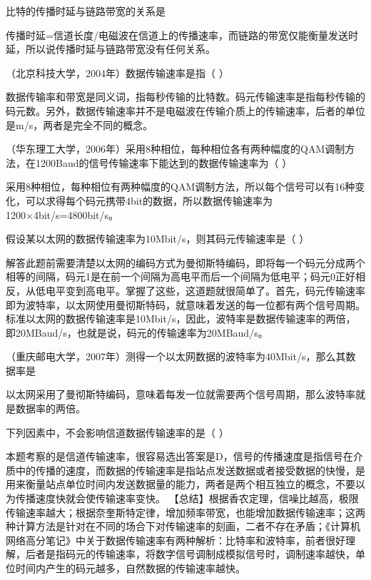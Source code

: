 \question 比特的传播时延与链路带宽的关系是
\par{}
\begin{solution}传播时延=信道长度/电磁波在信道上的传播速率，而链路的带宽仅能衡量发送时延，所以说传播时延与链路带宽没有任何关系。
\end{solution}
\question （北京科技大学，2004年）数据传输速率是指（ ）
\par{}
\begin{solution}数据传输率和带宽是同义词，指每秒传输的比特数。码元传输速率是指每秒传输的码元数。另外，数据传输速率并不是电磁波在传输介质上的传输速率，后者的单位是m/s，两者是完全不同的概念。
\end{solution}
\question （华东理工大学，2006年）采用8种相位，每种相位各有两种幅度的QAM调制方法，在1200Baud的信号传输速率下能达到的数据传输速率为（
）
\par{}
\begin{solution}采用8种相位，每种相位有两种幅度的QAM调制方法，所以每个信号可以有16种变化，可以求得每个码元携带4bit的数据，所以数据传输速率为1200×4bit/s=4800bit/s。
\end{solution}
\question 假设某以太网的数据传输速率为10Mbit/s，则其码元传输速率是（ ）
\par{}
\begin{solution}解答此题前需要清楚以太网的编码方式为曼彻斯特编码，即将每一个码元分成两个相等的间隔，码元1是在前一个间隔为高电平而后一个间隔为低电平；码元0正好相反，从低电平变到高电平。掌握了这些，这道题就很简单了。首先，码元传输速率即为波特率，以太网使用曼彻斯特码，就意味着发送的每一位都有两个信号周期。标准以太网的数据传输速率是10Mbit/s，因此，波特率是数据传输速率的两倍，即20MBaud/s，也就是说，码元的传输速率为20MBaud/s。
\end{solution}
\question （重庆邮电大学，2007年）测得一个以太网数据的波特率为40Mbit/s，那么其数据率是
\par{}
\begin{solution}以太网采用了曼彻斯特编码，意味着每发一位就需要两个信号周期，那么波特率就是数据率的两倍。
\end{solution}
\question 下列因素中，不会影响信道数据传输速率的是（ ）
\par{}
\begin{solution}本题考察的是信道传输速率，很容易选出答案是D，信号的传播速度是指信号在介质中的传播的速度，而数据的传输速率是指站点发送数据或者接受数据的快慢，是用来衡量站点单位时间内发送数据量的能力，两者是两个相互独立的概念，不要以为传播速度快就会使传输速率变快。
【总结】根据香农定理，信噪比越高，极限传输速率越大；根据奈奎斯特定律，增加频率带宽，也能增加数据传输速率；这两种计算方法是针对在不同的场合下对传输速率的刻画，二者不存在矛盾；《计算机网络高分笔记》中关于数据传输速率有两种解析：比特率和波特率，前者很好理解，后者是指码元的传输速率，将数字信号调制成模拟信号时，调制速率越快，单位时间内产生的码元越多，自然数据的传输速率越快。
\end{solution}
